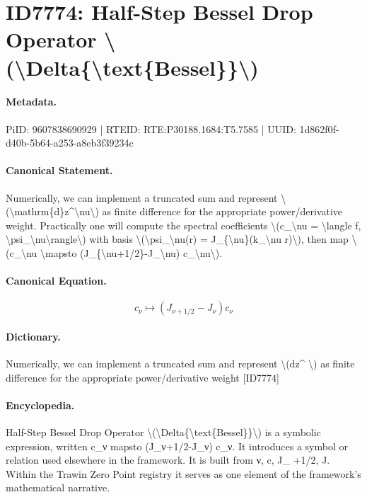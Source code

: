 \section*{ID7774: Half-Step Bessel Drop Operator \textbackslash{}(\textbackslash{}Delta\{\textbackslash{}text\{Bessel\}\}\textbackslash{})}
\paragraph{Metadata.}
PiID: 9607838690929 | RTEID: RTE:P30188.1684:T5.7585 | UUID: 1d862f0f-d40b-5b64-a253-a8eb3f39234c

\paragraph{Canonical Statement.}
Numerically, we can implement a truncated sum and represent \textbackslash{}(\textbackslash{}mathrm\{d\}z\textasciicircum{}\textbackslash{}nu\textbackslash{}) as finite difference for the appropriate power/derivative weight. Practically one will compute the spectral coefficients \textbackslash{}(c\_\textbackslash{}nu = \textbackslash{}langle f, \textbackslash{}psi\_\textbackslash{}nu\textbackslash{}rangle\textbackslash{}) with basis \textbackslash{}(\textbackslash{}psi\_\textbackslash{}nu(r) = J\_\{\textbackslash{}nu\}(k\_\textbackslash{}nu r)\textbackslash{}), then map \textbackslash{}(c\_\textbackslash{}nu \textbackslash{}mapsto (J\_\{\textbackslash{}nu+1/2\}-J\_\textbackslash{}nu) c\_\textbackslash{}nu\textbackslash{}).

\paragraph{Canonical Equation.}
\[
c_\nu \mapsto (J_{\nu+1/2}-J_\nu) c_\nu
\]

\paragraph{Dictionary.}
Numerically, we can implement a truncated sum and represent \textbackslash{}(dz\textasciicircum{} \textbackslash{}) as finite difference for the appropriate power/derivative weight [ID7774]

\paragraph{Encyclopedia.}
Half-Step Bessel Drop Operator \textbackslash{}(\textbackslash{}Delta\{\textbackslash{}text\{Bessel\}\}\textbackslash{}) is a symbolic expression, written c\_ν mapsto (J\_ν+1/2-J\_ν) c\_ν. It introduces a symbol or relation used elsewhere in the framework. It is built from ν, c, J\_ +1/2, J. Within the Trawin Zero Point registry it serves as one element of the framework's mathematical narrative.

